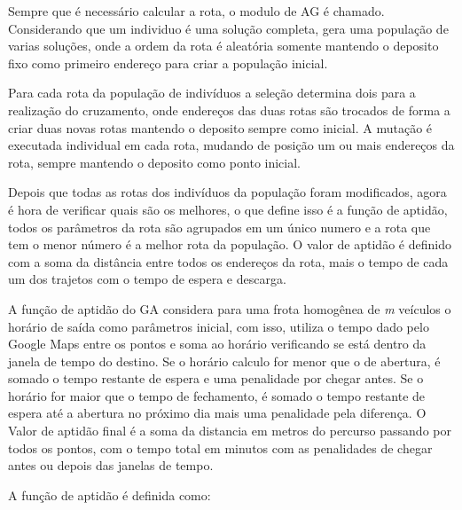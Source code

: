 Sempre que é necessário calcular a rota, o modulo de AG é chamado. Considerando que um individuo é uma solução completa, gera uma população de varias soluções, onde a ordem da rota é aleatória somente mantendo o deposito fixo como primeiro endereço para criar a população inicial.

Para cada rota da população de indivíduos a seleção determina dois para a realização do cruzamento, onde endereços das duas rotas são trocados de forma a criar duas novas rotas mantendo o deposito sempre como inicial. A mutação é executada individual em cada rota, mudando de posição um ou mais endereços da rota, sempre mantendo o deposito como ponto inicial.

Depois que todas as rotas dos indivíduos da população foram modificados, agora é hora de verificar quais são os melhores, o que define isso é a função de aptidão, todos os parâmetros da rota são agrupados em um único numero e a rota que tem o menor número é a melhor rota da população. O valor de aptidão é definido com a soma da distância entre todos os endereços da rota, mais o tempo de cada um dos trajetos com o tempo de espera e descarga.

A função de aptidão do GA considera para uma frota homogênea de \textit{m} veículos o horário de saída como parâmetros inicial, com isso, utiliza o tempo dado pelo Google Maps entre os pontos e soma ao horário verificando se está dentro da janela de tempo do destino. Se o horário calculo for menor que o de abertura, é somado o tempo restante de espera e uma penalidade por chegar antes. Se o horário for maior que o tempo de fechamento, é somado o tempo restante de espera até a abertura no próximo dia mais uma penalidade pela diferença. O Valor de aptidão final é a soma da distancia em metros do percurso passando por todos os pontos, com o tempo total em minutos com as penalidades de chegar antes ou depois das janelas de tempo.

A função de aptidão é definida como:

\begin{center}
	\label{fig:MetodoAptidao}
\end{center}

